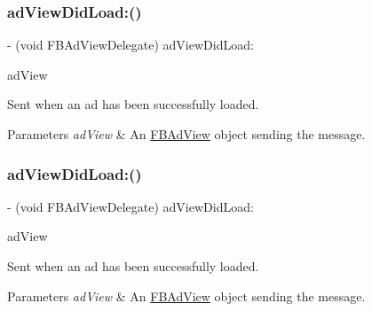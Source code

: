 \subsubsection{\texorpdfstring{ad\+View\+Did\+Load\+:()}{adViewDidLoad:()}\hspace{0.1cm}{\footnotesize\ttfamily [1/5]}}
{\footnotesize\ttfamily -\/ (void F\+B\+Ad\+View\+Delegate) ad\+View\+Did\+Load\+: \begin{DoxyParamCaption}\item[{(\hyperlink{interfaceFBAdView}{F\+B\+Ad\+View} $\ast$)}]{ad\+View }\end{DoxyParamCaption}\hspace{0.3cm}{\ttfamily [optional]}}

Sent when an ad has been successfully loaded.


\begin{DoxyParams}{Parameters}
{\em ad\+View} & An \hyperlink{interfaceFBAdView}{F\+B\+Ad\+View} object sending the message. \\
\hline
\end{DoxyParams}
\mbox{\label{protocolFBAdViewDelegate_01-p_a77334fc3e7bcc1f4ed61e1fbd372359a}} 
\subsubsection{\texorpdfstring{ad\+View\+Did\+Load\+:()}{adViewDidLoad:()}\hspace{0.1cm}{\footnotesize\ttfamily [2/5]}}
{\footnotesize\ttfamily -\/ (void F\+B\+Ad\+View\+Delegate) ad\+View\+Did\+Load\+: \begin{DoxyParamCaption}\item[{(\hyperlink{interfaceFBAdView}{F\+B\+Ad\+View} $\ast$)}]{ad\+View }\end{DoxyParamCaption}\hspace{0.3cm}{\ttfamily [optional]}}

Sent when an ad has been successfully loaded.


\begin{DoxyParams}{Parameters}
{\em ad\+View} & An \hyperlink{interfaceFBAdView}{F\+B\+Ad\+View} object sending the message. \\
\hline
\end{DoxyParams}
\mbox{\label{protocolFBAdViewDelegate_01-p_a77334fc3e7bcc1f4ed61e1fbd372359a}} 

